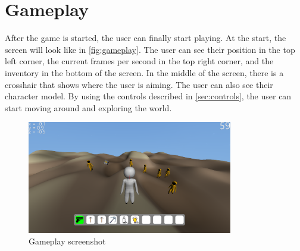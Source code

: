 \section{Gameplay}\label{sec:gameplay}
After the game is started, the user can finally start playing.
At the start, the screen will look like in \autoref{fig:gameplay}.
The user can see their position in the top left corner, the current frames per second in the top right corner, and the inventory in the bottom of the screen.
In the middle of the screen, there is a crosshair that shows where the user is aiming.
The user can also see their character model.
By using the controls described in \autoref{sec:controls}, the user can start moving around and exploring the world.

\begin{figure}[H]
    \centering
    \includegraphics[width=0.8\textwidth]{chapters/user_manual/resources/gameplay.png}
    \caption{Gameplay screenshot}
    \label{fig:gameplay}
\end{figure}